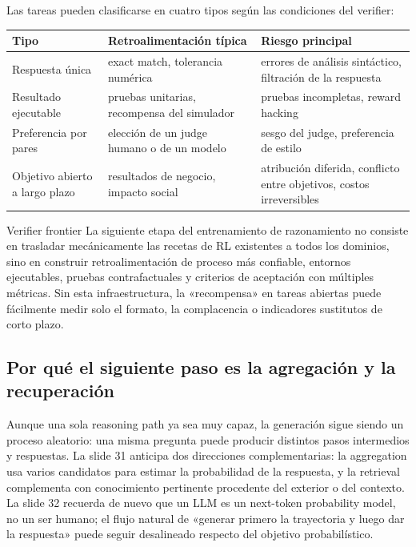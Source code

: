 
Las tareas pueden clasificarse en cuatro tipos según las condiciones del verifier:
\begin{center}
\begin{tabularx}{0.96\textwidth}{p{}X X}
\toprule
Tipo & Retroalimentación típica & Riesgo principal \\
\midrule
Respuesta única & exact match, tolerancia numérica & errores de análisis sintáctico, filtración de la respuesta \\
Resultado ejecutable & pruebas unitarias, recompensa del simulador & pruebas incompletas, reward hacking \\
Preferencia por pares & elección de un judge humano o de un modelo & sesgo del judge, preferencia de estilo \\
Objetivo abierto a largo plazo & resultados de negocio, impacto social & atribución diferida, conflicto entre objetivos, costos irreversibles \\
\bottomrule
\end{tabularx}
\end{center}

\begin{knowledgebox}{Verifier frontier}
La siguiente etapa del entrenamiento de razonamiento no consiste en trasladar mecánicamente las recetas de RL existentes a todos los dominios, sino en construir retroalimentación de proceso más confiable, entornos ejecutables, pruebas contrafactuales y criterios de aceptación con múltiples métricas. Sin esta infraestructura, la «recompensa» en tareas abiertas puede fácilmente medir solo el formato, la complacencia o indicadores sustitutos de corto plazo.
\end{knowledgebox}

\subsection{Por qué el siguiente paso es la agregación y la recuperación}

Aunque una sola reasoning path ya sea muy capaz, la generación sigue siendo un proceso aleatorio: una misma pregunta puede producir distintos pasos intermedios y respuestas. La slide 31 anticipa dos direcciones complementarias: la aggregation usa varios candidatos para estimar la probabilidad de la respuesta, y la retrieval complementa con conocimiento pertinente procedente del exterior o del contexto. La slide 32 recuerda de nuevo que un LLM es un next-token probability model, no un ser humano; el flujo natural de «generar primero la trayectoria y luego dar la respuesta» puede seguir desalineado respecto del objetivo probabilístico.

